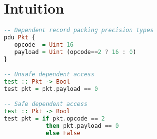 \section{Intuition}

\begin{lstlisting}[language=Haskell]
-- Dependent record packing precision types
pdu Pkt {
   opcode  = Uint 16
   payload = Uint (opcode==2 ? 16 : 0)
}

-- Unsafe dependent access
test :: Pkt -> Bool
test pkt = pkt.payload == 0

-- Safe dependent access
test :: Pkt -> Bool
test pkt = if pkt.opcode == 2 
            then pkt.payload == 0 
            else False
\end{lstlisting}

